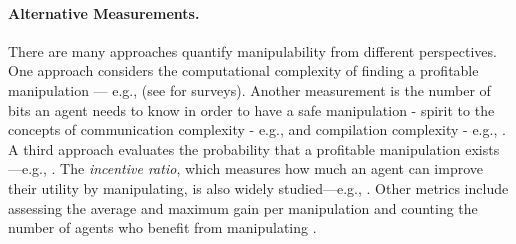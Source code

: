 \paragraph{Alternative Measurements.}
There are many approaches quantify manipulability from different perspectives. 
One approach considers the computational complexity of finding a profitable manipulation — e.g., \cite{bartholdi1989computational,bartholdi1991single} (see \cite{faliszewski2010ai,veselova2016computational} for surveys). 
Another measurement is the number of bits
an agent needs to know in order to have a safe manipulation - spirit to the concepts of communication complexity - e.g., \cite{nisan2002communication, grigorieva2006communication, Communication2019Branzei,Babichenko2019communication} and compilation complexity - e.g., \citep{chevaleyre2009compiling,xia2010compilation,karia2021compilation}.
A third approach evaluates the probability that a profitable manipulation exists —e.g., \cite{barrot2017manipulation,lackner2018approval,lackner2023free}.
The \emph{incentive ratio}, which measures how much an agent can improve their utility by manipulating, is also widely studied—e.g., \cite{chen2011profitable,chen2022incentive,li2024bounding,cheng2022tight,cheng2019improved}. Other metrics include assessing the average and maximum gain per manipulation \cite{aleskerov1999degree} and counting the number of agents who benefit from manipulating \cite{andersson2014budget,andersson2014least}.




